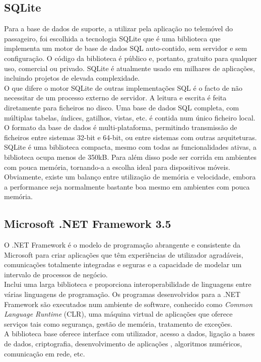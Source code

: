 \subsection{SQLite}

Para a base de dados de suporte, a utilizar pela aplicação no telemóvel do passageiro, foi escolhida a tecnologia SQLite que é uma biblioteca que implementa um motor de base de dados SQL auto-contido, sem servidor e sem configuração. O código da biblioteca é público e, portanto, gratuito para qualquer uso, comercial ou privado. SQLite é atualmente usado em milhares de aplicações, incluindo projetos de elevada complexidade.
\\O que difere o motor SQLite de outras implementações SQL é o facto de não necessitar de um processo externo de servidor. A leitura e escrita é feita diretamente para ficheiros no disco. Uma base de dados SQL completa, com múltiplas tabelas, índices, gatilhos, vistas, etc. é contida num único ficheiro local. O formato da base de dados é multi-plataforma, permitindo transmissão de ficheiros entre sistemas 32-bit e 64-bit, ou entre sistemas com outras arquiteturas.
\\SQLite é uma biblioteca compacta, mesmo com todas as funcionalidades ativas, a biblioteca ocupa menos de 350kB. Para além disso pode ser corrida em ambientes com pouca memória, tornando-a a escolha ideal para dispositivos móveis. Obviamente, existe um balanço entre utilização de memória e velocidade, embora a performance seja normalmente bastante boa mesmo em ambientes com pouca memória.\cite{sqlite}

\subsection{Microsoft .NET Framework 3.5}

O .NET Framework é o modelo de programação abrangente e consistente da Microsoft para criar aplicações que têm experiências de utilizador agradáveis, comunicações totalmente integradas e seguras e a capacidade de modelar um intervalo de processos de negócio.
\\Inclui uma larga biblioteca e proporciona interoperabilidade de linguagens entre várias linguagens de programação. Os programas desenvolvidos para a .NET Framework são executados num ambiente de software, conhecido como \textit{Common Language Runtime} (CLR), uma máquina virtual de aplicações que oferece serviços tais como segurança, gestão de memória, tratamento de exceções.
\\A biblioteca base oferece interface com utilizador, acesso a dados, ligação a bases de dados, criptografia, desenvolvimento de aplicações \web, algoritmos numéricos, comunicação em rede, etc.

